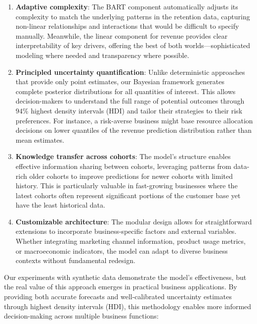 \documentclass[11pt]{amsart}
\theoremstyle{definition}
\begin{document}
\begin{enumerate}
    \item \textbf{Adaptive complexity}: The BART component automatically adjusts its complexity to match the underlying
          patterns in the retention data, capturing non-linear relationships and interactions that would be difficult to
          specify manually. Meanwhile, the linear component for revenue provides clear interpretability of key drivers,
          offering the best of both worlds—sophisticated modeling where needed and transparency where possible.

    \item \textbf{Principled uncertainty quantification}: Unlike deterministic approaches that provide only point estimates,
          our Bayesian framework generates complete posterior distributions for all quantities of interest. This allows
          decision-makers to understand the full range of potential outcomes through $94\%$ highest density intervals (HDI) and
          tailor their strategies to their risk preferences. For instance, a risk-averse business might base resource
          allocation decisions on lower quantiles of the revenue prediction distribution rather than mean estimates.

    \item \textbf{Knowledge transfer across cohorts}: The model's structure enables effective information sharing between
          cohorts, leveraging patterns from data-rich older cohorts to improve predictions for newer cohorts with limited
          history. This is particularly valuable in fast-growing businesses where the latest cohorts often represent
          significant portions of the customer base yet have the least historical data.

    \item \textbf{Customizable architecture}: The modular design allows for straightforward extensions to incorporate
          business-specific factors and external variables. Whether integrating marketing channel information, product usage
          metrics, or macroeconomic indicators, the model can adapt to diverse business contexts without fundamental redesign.
\end{enumerate}

Our experiments with synthetic data demonstrate the model's effectiveness, but the real value of this approach emerges in
practical business applications. By providing both accurate forecasts and well-calibrated uncertainty estimates through
highest density intervals (HDI), this methodology enables more informed decision-making across multiple business functions:
\end{document}
